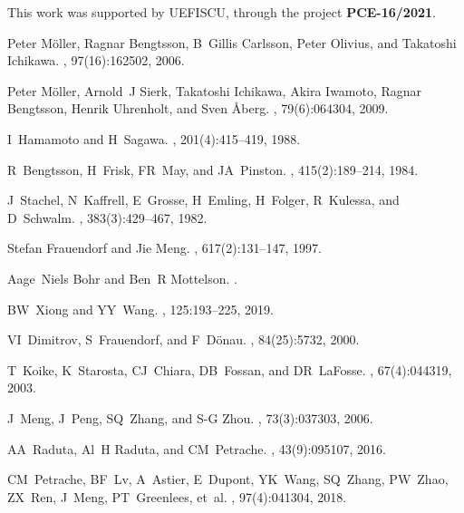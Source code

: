 \documentclass[myclassdoc,debug]{rjparticle}
\begin{document}
\begin{acknowledgement}
This work was supported by UEFISCU, through the project \textbf{PCE-16/2021}.
\end{acknowledgement}

\begin{thebibliography}{99}

Peter M{\"o}ller, Ragnar Bengtsson, B~Gillis Carlsson, Peter Olivius, and
  Takatoshi Ichikawa.
, 97(16):162502, 2006.

Peter M{\"o}ller, Arnold~J Sierk, Takatoshi Ichikawa, Akira Iwamoto, Ragnar
  Bengtsson, Henrik Uhrenholt, and Sven {\AA}berg.
, 79(6):064304, 2009.

I~Hamamoto and H~Sagawa.
, 201(4):415--419, 1988.

R~Bengtsson, H~Frisk, FR~May, and JA~Pinston.
, 415(2):189--214, 1984.

J~Stachel, N~Kaffrell, E~Grosse, H~Emling, H~Folger, R~Kulessa, and D~Schwalm.
, 383(3):429--467, 1982.

Stefan Frauendorf and Jie Meng.
, 617(2):131--147, 1997.

Aage~Niels Bohr and Ben~R Mottelson.
.

BW~Xiong and YY~Wang.
, 125:193--225, 2019.

VI~Dimitrov, S~Frauendorf, and F~D{\"o}nau.
, 84(25):5732, 2000.

T~Koike, K~Starosta, CJ~Chiara, DB~Fossan, and DR~LaFosse.
, 67(4):044319, 2003.

J~Meng, J~Peng, SQ~Zhang, and S-G Zhou.
, 73(3):037303, 2006.

AA~Raduta, Al~H Raduta, and CM~Petrache.
,
  43(9):095107, 2016.

CM~Petrache, BF~Lv, A~Astier, E~Dupont, YK~Wang, SQ~Zhang, PW~Zhao, ZX~Ren,
  J~Meng, PT~Greenlees, et~al.
, 97(4):041304, 2018.


\end{thebibliography}
\end{document}

